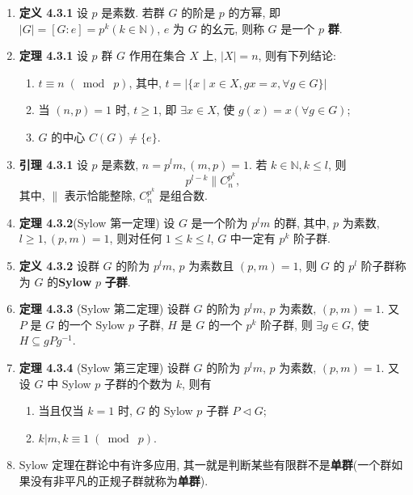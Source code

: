 \documentclass[UTF8]{ctexart}
\begin{document}
\begin{enumerate}
\item \textbf{定义 4.3.1} 设 $p$ 是素数. 若群 $G$ 的阶是 $p$ 的方幂, 即 $\left\lvert G\right\lvert = [G : e] = p^k(k \in \mathbb{N})$, $e$ 为 $G$ 的幺元, 则称 $G$ 是一个 $p$ \textbf{群}.
\item \textbf{定理 4.3.1} 设 $p$ 群 $G$ 作用在集合 $X$ 上, $\left\lvert X\right\rvert = n$, 则有下列结论:
\begin{enumerate}
  \item $t \equiv n\;(\bmod\;p)$, 其中, $t = \left\lvert\{x \mid x\in X, gx=x,\forall g\in G\}\right\rvert$
  \item 当 $(n,p) = 1$ 时, $t\geqslant1$, 即 $\exists x\in X$, 使 $g(x) = x(\forall g\in G)$;
  \item $G$ 的中心 $C(G)\neq\{e\}$.
\end{enumerate}

\item \textbf{引理 4.3.1} 设 $p$ 是素数, $n = p^lm, (m,p) = 1$. 若 $k\in\mathbb{N},k\leqslant l$, 则
\[
p^{l-k}\|C_n^{p^k},
\]
其中, $\|$ 表示恰能整除, $C_n^{p^k}$ 是组合数.

\item \textbf{定理 4.3.2}(Sylow 第一定理) 设 $G$ 是一个阶为 $p^lm$ 的群, 其中, $p$ 为素数, $l \geqslant 1, (p,m) = 1$, 则对任何 $1 \leqslant k \leqslant l$, $G$ 中一定有 $p^k$ 阶子群.

\item \textbf{定义 4.3.2} 设群 $G$ 的阶为 $p^lm$, $p$ 为素数且 $(p,m) = 1$, 则 $G$ 的 $p^l$ 阶子群称为 $G$ 的\textbf{Sylow} $p$ \textbf{子群}.

\item \textbf{定理 4.3.3} (Sylow 第二定理) 设群 $G$ 的阶为 $p^lm$, $p$ 为素数, $(p,m) = 1$. 又 $P$ 是 $G$ 的一个 Sylow $p$ 子群, $H$ 是 $G$ 的一个 $p^k$ 阶子群, 则 $\exists g\in G$, 使 $H\subseteq gPg^{-1}$.

\item \textbf{定理 4.3.4} (Sylow 第三定理) 设群 $G$ 的阶为 $p^lm$, $p$ 为素数, $(p,m) = 1$. 又设 $G$ 中 Sylow $p$ 子群的个数为 $k$, 则有
    \begin{enumerate}
      \item 当且仅当 $k = 1$ 时, $G$ 的 Sylow $p$ 子群 $P\vartriangleleft G$;
      \item $k|m, k \equiv 1\;(\bmod\;p)$.
    \end{enumerate}

\item Sylow 定理在群论中有许多应用, 其一就是判断某些有限群不是\textbf{单群}(一个群如果没有非平凡的正规子群就称为\textbf{单群}).


\end{enumerate}
\end{document}

